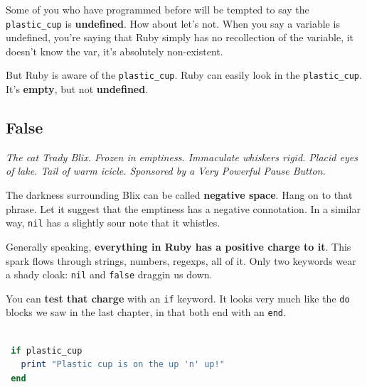 \documentclass[10pt,twoside]{report}
\begin{document}
Some of you who have programmed before will be tempted to say the
\lstinline[breaklines=true]|plastic_cup| is {\bf undefined}.  How
about let's not.  When you say a variable is undefined, you're saying
that Ruby simply has no recollection of the variable, it doesn't know
the var, it's absolutely non-existent.

But Ruby is aware of the \lstinline[breaklines=true]|plastic_cup|.
Ruby can easily look in the
\lstinline[breaklines=true]|plastic_cup|. It's {\bf empty}, but not
          {\bf undefined}.

\newpage



\subsection{False}




{\em The cat Trady Blix.  Frozen in emptiness.  Immaculate whiskers
  rigid.  Placid eyes of lake.  Tail of warm icicle.  Sponsored by a
  Very Powerful Pause Button.}

The darkness surrounding Blix can be called {\bf negative space}.
Hang on to that phrase. Let it suggest that the emptiness has a
negative connotation.  In a similar way,
\lstinline[breaklines=true]|nil| has a slightly sour note that it
whistles.

Generally speaking, {\bf everything in Ruby has a positive charge to
  it}.  This spark flows through strings, numbers, regexps, all of it.
Only two keywords wear a shady cloak: \lstinline[breaklines=true]|nil|
and \lstinline[breaklines=true]|false| draggin us down.

You can {\bf test that charge} with an \lstinline[breaklines=true]|if|
keyword.  It looks very much like the \lstinline[breaklines=true]|do|
blocks we saw in the last chapter, in that both end with an
\lstinline[breaklines=true]|end|.


\begin{lstlisting}[basicstyle=\ttfamily\color{basiccolor},
    commentstyle = \ttfamily\color{commentcolor},
    keywordstyle=\ttfamily\color{keywordscolor},
    stringstyle=\color{stringcolor},
    language=Ruby,
    basicstyle=\small\ttfamily,
    showstringspaces=false,
  ]

 if plastic_cup 
   print "Plastic cup is on the up 'n' up!" 
 end

\end{lstlisting}
\end{document}
